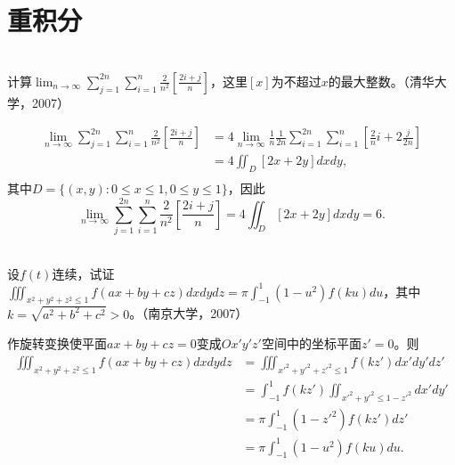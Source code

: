   \section{重积分}
  \begin{exercise}
  \hfill\\
    计算$\displaystyle\lim_{n\rightarrow\infty}\sum_{j=1}^{2n}\sum_{i=1}^n\frac2{n^2}[\frac{2i+j}n]$，这里$[x]$为不超过$x$的最大整数。（清华大学，2007）
  
  \begin{align*}
  \lim_{n\rightarrow\infty}\sum_{j=1}^{2n}\sum_{i=1}^n\frac{2}{n^2}[\frac{2i+j}{n}]&=4\lim_{n\rightarrow\infty}\frac{1}{n}\frac{1}{2n}\sum_{i=1}^{2n}\sum_{i=1}^n[\frac{2}{n}i+2\frac{j}{2n}]\\
  &=4\iint_D[2x+2y]dxdy,\\
  \end{align*}
  其中$D=\{(x,y):0\leq x\leq1,0\leq y\leq1\}$，因此
  $$\lim_{n\rightarrow\infty}\sum_{j=1}^{2n}\sum_{i=1}^n\frac{2}{n^2}[\frac{2i+j}{n}]=4\iint_D[2x+2y]dxdy=6.$$
  \end{exercise}
  
  \begin{exercise}
  \hfill\\
   设$f(t)$连续，试证$\displaystyle\iiint_{x^2+y^2+z^2\leq1}f(ax+by+cz)dxdydz=\pi\int_{-1}^1(1-u^2)f(ku)du$，其中$k=\sqrt{a^2+b^2+c^2}>0$。（南京大学，2007） 
  
   作旋转变换使平面$ax+by+cz=0$变成$Ox'y'z'$空间中的坐标平面$z'=0$。则
  \begin{align*}
  \iiint_{x^2+y^2+z^2\leq 1}f(ax+by+cz)dxdydz&=\iiint_{x'^2+y'^2+z'^2\leq1}f(kz')dx'dy'dz'\\
  &=\int_{-1}^1f(kz')\iint_{x'^2+y'^2\leq1-z'^2}dx'dy'\\
  &=\pi\int_{-1}^1(1-z'^2)f(kz')dz'\\
  &=\pi\int_{-1}^1(1-u^2)f(ku)du.\\
  \end{align*} 
  \end{exercise}
  
